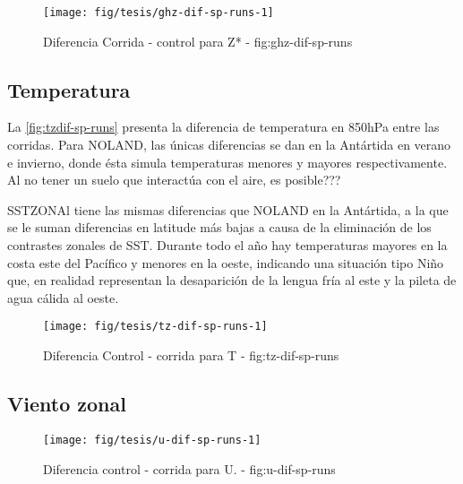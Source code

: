 \documentclass[spanish,a4paper,12p]{book}
\begin{document}
\begin{figure*}
\texttt{[image: fig/tesis/ghz-dif-sp-runs-1]} \caption{Diferencia Corrida - control para Z* - fig:ghz-dif-sp-runs}\label{fig:ghz-dif-sp-runs}
\end{figure*}

\subsection{Temperatura}\label{temperatura-2}

La \autoref{fig:tzdif-sp-runs} presenta la diferencia de temperatura en
850hPa entre las corridas. Para NOLAND, las únicas diferencias se dan en
la Antártida en verano e invierno, donde ésta simula temperaturas
menores y mayores respectivamente. Al no tener un suelo que interactúa
con el aire, es posible???

SSTZONAl tiene las mismas diferencias que NOLAND en la Antártida, a la
que se le suman diferencias en latitude más bajas a causa de la
eliminación de los contrastes zonales de SST. Durante todo el año hay
temperaturas mayores en la costa este del Pacífico y menores en la
oeste, indicando una situación tipo Niño que, en realidad representan la
desaparición de la lengua fría al este y la pileta de agua cálida al
oeste.

\begin{landscape}\begin{figure}

{\centering \texttt{[image: fig/tesis/tz-dif-sp-runs-1]} 

}

\caption{Diferencia Control - corrida para T - fig:tz-dif-sp-runs}\label{fig:tz-dif-sp-runs}
\end{figure}
\end{landscape}

\subsection{Viento zonal}\label{viento-zonal-2}

\begin{landscape}\begin{figure}

{\centering \texttt{[image: fig/tesis/u-dif-sp-runs-1]} 

}

\caption{Diferencia control - corrida para U. - fig:u-dif-sp-runs}\label{fig:u-dif-sp-runs}
\end{figure}
\end{landscape}
\end{document}
